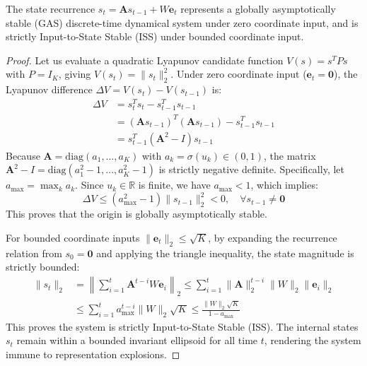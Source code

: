 \begin{lemma}
\label{lem:lyapunov}
The state recurrence $s_t = \mathbf{A} s_{t-1} + W \mathbf{e}_t$ represents a globally asymptotically stable (GAS) discrete-time dynamical system under zero coordinate input, and is strictly Input-to-State Stable (ISS) under bounded coordinate input.
\end{lemma}

\begin{proof}
Let us evaluate a quadratic Lyapunov candidate function $V(s) = s^T P s$ with $P = I_K$, giving $V(s_t) = \|s_t\|_2^2$. Under zero coordinate input ($\mathbf{e}_t = \mathbf{0}$), the Lyapunov difference $\Delta V = V(s_t) - V(s_{t-1})$ is:
\begin{align}
    \Delta V &= s_t^T s_t - s_{t-1}^T s_{t-1} \nonumber \\
    &= (\mathbf{A} s_{t-1})^T (\mathbf{A} s_{t-1}) - s_{t-1}^T s_{t-1} \nonumber \\
    &= s_{t-1}^T (\mathbf{A}^2 - I) s_{t-1}
\end{align}
Because $\mathbf{A} = \text{diag}(a_1, \dots, a_K)$ with $a_k = \sigma(u_k) \in (0, 1)$, the matrix $\mathbf{A}^2 - I = \text{diag}(a_1^2 - 1, \dots, a_K^2 - 1)$ is strictly negative definite. Specifically, let $a_{\max} = \max_k a_k$. Since $u_k \in \mathbb{R}$ is finite, we have $a_{\max} < 1$, which implies:
\begin{equation}
    \Delta V \le (a_{\max}^2 - 1) \|s_{t-1}\|_2^2 < 0, \quad \forall s_{t-1} \ne \mathbf{0}
\end{equation}
This proves that the origin is globally asymptotically stable.

For bounded coordinate inputs $\|\mathbf{e}_t\|_2 \le \sqrt{K}$, by expanding the recurrence relation from $s_0 = \mathbf{0}$ and applying the triangle inequality, the state magnitude is strictly bounded:
\begin{align}
    \|s_t\|_2 &= \left\| \sum_{i=1}^t \mathbf{A}^{t-i} W \mathbf{e}_i \right\|_2 \le \sum_{i=1}^t \|\mathbf{A}\|_2^{t-i} \|W\|_2 \|\mathbf{e}_i\|_2 \nonumber \\
    &\le \sum_{i=1}^t a_{\max}^{t-i} \|W\|_2 \sqrt{K} \le \frac{\|W\|_2 \sqrt{K}}{1 - a_{\max}}
\end{align}
This proves the system is strictly Input-to-State Stable (ISS). The internal states $s_t$ remain within a bounded invariant ellipsoid for all time $t$, rendering the system immune to representation explosions.


\end{proof}
